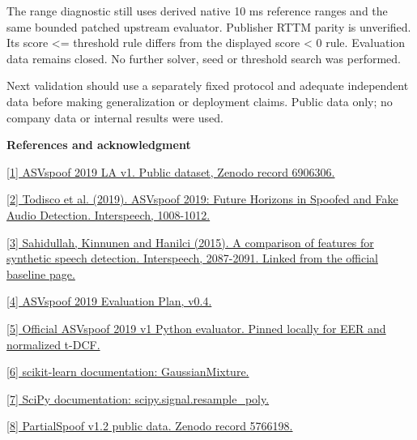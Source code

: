 \documentclass[10pt,a4paper]{article}
\newcommand{\reporttitle}[1]{{\color{navy}\Large\bfseries #1}\par\vspace{5pt}}
\begin{document}
The range diagnostic still uses derived native 10 ms reference ranges and the same bounded patched upstream evaluator. Publisher RTTM parity is unverified. Its score <= threshold rule differs from the displayed score < 0 rule. Evaluation data remains closed. No further solver, seed or threshold search was performed.\par

{\small Next validation should use a separately fixed protocol and adequate independent data before making generalization or deployment claims. Public data only; no company data or internal results were used.}\par

\clearpage

\reporttitle{References and acknowledgment}

{\small

\href{https://zenodo.org/records/6906306}{[1] ASVspoof 2019 LA v1. Public dataset, Zenodo record 6906306.}\par

\href{https://www.isca-archive.org/interspeech_2019/todisco19_interspeech.html}{[2] Todisco et al. (2019). ASVspoof 2019: Future Horizons in Spoofed and Fake Audio Detection. Interspeech, 1008-1012.}\par

\href{https://www.asvspoof.org/index2019.html}{[3] Sahidullah, Kinnunen and Hanilci (2015). A comparison of features for synthetic speech detection. Interspeech, 2087-2091. Linked from the official baseline page.}\par

\href{https://www.asvspoof.org/asvspoof2019/asvspoof2019_evaluation_plan.pdf}{[4] ASVspoof 2019 Evaluation Plan, v0.4.}\par

\href{https://www.asvspoof.org/asvspoof2019/tDCF_python_v1.zip}{[5] Official ASVspoof 2019 v1 Python evaluator. Pinned locally for EER and normalized t-DCF.}\par

\href{https://scikit-learn.org/stable/modules/generated/sklearn.mixture.GaussianMixture.html}{[6] scikit-learn documentation: GaussianMixture.}\par

\href{https://docs.scipy.org/doc/scipy/reference/generated/scipy.signal.resample_poly.html}{[7] SciPy documentation: scipy.signal.resample\_poly.}\par

\href{https://zenodo.org/records/5766198}{[8] PartialSpoof v1.2 public data. Zenodo record 5766198.}\par

}
\end{document}
